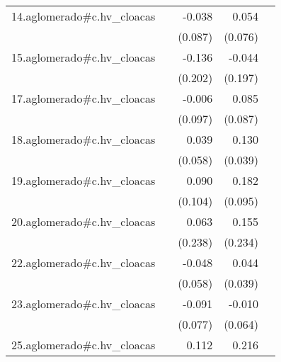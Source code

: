 {\begin{longtable}{l*{4}{D{.}{.}{-1}}}
\addlinespace
14.aglomerado#c.hv\_cloacas&                     &      -0.038         &       0.054         &                     \\
            &                     &     (0.087)         &     (0.076)         &                     \\
\addlinespace
15.aglomerado#c.hv\_cloacas&                     &      -0.136         &      -0.044         &                     \\
            &                     &     (0.202)         &     (0.197)         &                     \\
\addlinespace
17.aglomerado#c.hv\_cloacas&                     &      -0.006         &       0.085         &                     \\
            &                     &     (0.097)         &     (0.087)         &                     \\
\addlinespace
18.aglomerado#c.hv\_cloacas&                     &       0.039         &       0.130\sym{***}&                     \\
            &                     &     (0.058)         &     (0.039)         &                     \\
\addlinespace
19.aglomerado#c.hv\_cloacas&                     &       0.090         &       0.182         &                     \\
            &                     &     (0.104)         &     (0.095)         &                     \\
\addlinespace
20.aglomerado#c.hv\_cloacas&                     &       0.063         &       0.155         &                     \\
            &                     &     (0.238)         &     (0.234)         &                     \\
\addlinespace
22.aglomerado#c.hv\_cloacas&                     &      -0.048         &       0.044         &                     \\
            &                     &     (0.058)         &     (0.039)         &                     \\
\addlinespace
23.aglomerado#c.hv\_cloacas&                     &      -0.091         &      -0.010         &                     \\
            &                     &     (0.077)         &     (0.064)         &                     \\
\addlinespace
25.aglomerado#c.hv\_cloacas&                     &       0.112         &       0.216\sym{**} &                     \\

\end{longtable}}
